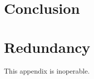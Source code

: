 \documentclass[onehalf,11pt]{beavtex}
\begin{document}
\chapter{Conclusion}
% 







\appendix
\chapter{Redundancy}
This appendix is inoperable.
\end{document}
